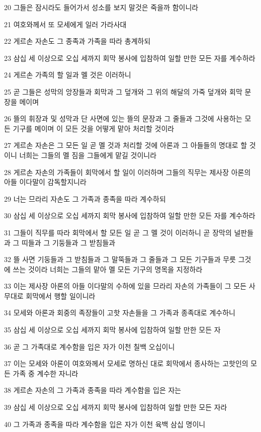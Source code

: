 \par 20 그들은 잠시라도 들어가서 성소를 보지 말것은 죽을까 함이니라
\par 21 여호와께서 또 모세에게 일러 가라사대
\par 22 게르손 자손도 그 종족과 가족을 따라 총계하되
\par 23 삼십 세 이상으로 오십 세까지 회막 봉사에 입참하여 일할 만한 모든 자를 계수하라
\par 24 게르손 가족의 할 일과 멜 것은 이러하니
\par 25 곧 그들은 성막의 앙장들과 회막과 그 덮개와 그 위의 해달의 가죽 덮개와 회막 문장을 메이며
\par 26 뜰의 휘장과 및 성막과 단 사면에 있는 뜰의 문장과 그 줄들과 그것에 사용하는 모든 기구를 메이며 이 모든 것을 어떻게 맡아 처리할 것이라
\par 27 게르손 자손은 그 모든 일 곧 멜 것과 처리할 것에 아론과 그 아들들의 명대로 할 것이니 너희는 그들의 멜 짐을 그들에게 맡길 것이니라
\par 28 게르손 자손의 가족들이 회막에서 할 일이 이러하며 그들의 직무는 제사장 아론의 아들 이다말이 감독할지니라
\par 29 너는 므라리 자손도 그 가족과 종족을 따라 계수하되
\par 30 삼십 세 이상으로 오십 세까지 회막 봉사에 입참하여 일할 만한 모든 자를 계수하라
\par 31 그들이 직무를 따라 회막에서 할 모든 일 곧 그 멜 것이 이러하니 곧 장막의 널판들과 그 띠들과 그 기둥들과 그 받침들과
\par 32 뜰 사면 기둥들과 그 받침들과 그 말뚝들과 그 줄들과 그 모든 기구들과 무릇 그것에 쓰는 것이라 너희는 그들의 맡아 멜 모든 기구의 명목을 지정하라
\par 33 이는 제사장 아론의 아들 이다말의 수하에 있을 므라리 자손의 가족들이 그 모든 사무대로 회막에서 행할 일이니라
\par 34 모세와 아론과 회중의 족장들이 고핫 자손들을 그 가족과 종족대로 계수하니
\par 35 삼십 세 이상으로 오십 세까지 회막 봉사에 입참하여 일할 만한 모든 자
\par 36 곧 그 가족대로 계수함을 입은 자가 이천 칠백 오십이니
\par 37 이는 모세와 아론이 여호와께서 모세로 명하신 대로 회막에서 종사하는 고핫인의 모든 가족 중 계수한 자니라
\par 38 게르손 자손의 그 가족과 종족을 따라 계수함을 입은 자는
\par 39 삼십 세 이상으로 오십 세까지 회막 봉사에 입참하여 일할 만한 모든 자라
\par 40 그 가족과 종족을 따라 계수함을 입은 자가 이천 육백 삼십 명이니
